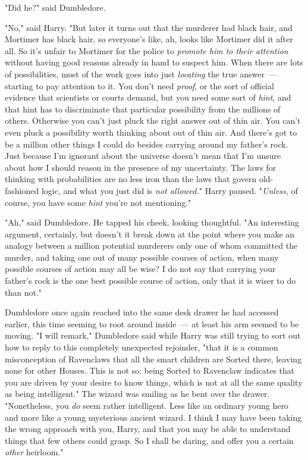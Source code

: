 "Did he?" said Dumbledore.

"No," said Harry. "But later it turns out that the murderer had black hair, and
Mortimer has black hair, so everyone's like, ah, looks like Mortimer did it
after all. So it's unfair to Mortimer for the police to \emph{promote him to
their attention} without having good reasons already in hand to suspect him.
When there are lots of possibilities, most of the work goes into just
\emph{locating} the true answer~--- starting to pay attention to it. You don't
need \emph{proof}, or the sort of official evidence that scientists or courts
demand, but you need some sort of \emph{hint}, and that hint has to
discriminate that particular possibility from the millions of others. Otherwise
you can't just pluck the right answer out of thin air. You can't even pluck a
possibility worth thinking about out of thin air. And there's got to be a
million other things I could do besides carrying around my father's rock. Just
because I'm ignorant about the universe doesn't mean that I'm unsure about how
I should reason in the presence of my uncertainty. The laws for thinking with
probabilities are no less iron than the laws that govern old-fashioned logic,
and what you just did is \emph{not allowed.}" Harry paused. "\emph{Unless}, of
course, you have some \emph{hint} you're not mentioning."

"Ah," said Dumbledore. He tapped his cheek, looking thoughtful. "An interesting
argument, certainly, but doesn't it break down at the point where you make an
analogy between a million potential murderers only one of whom committed the
murder, and taking one out of many possible courses of action, when many
possible courses of action may all be wise? I do not say that carrying your
father's rock is the one best possible course of action, only that it is wiser
to do than not."

Dumbledore once again reached into the same desk drawer he had accessed
earlier, this time seeming to root around inside~--- at least his arm seemed to
be moving. "I will remark," Dumbledore said while Harry was still trying to
sort out how to reply to this completely unexpected rejoinder, "that it is a
common misconception of Ravenclaws that all the smart children are Sorted
there, leaving none for other Houses. This is not so; being Sorted to Ravenclaw
indicates that you are driven by your desire to know things, which is not at
all the same quality as being intelligent." The wizard was smiling as he bent
over the drawer. "Nonetheless, you \emph{do} seem rather intelligent. Less like
an ordinary young hero and more like a young mysterious ancient wizard. I think
I may have been taking the wrong approach with you, Harry, and that you may be
able to understand things that few others could grasp. So I shall be daring,
and offer you a certain \emph{other} heirloom."

